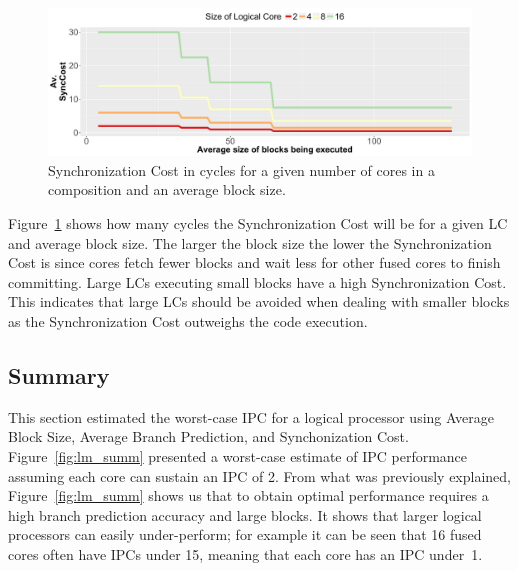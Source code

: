 \begin{figure}[h]
    \centering
    \includegraphics[width=\textwidth]{cases-paper/graphics/limit_study/sync_cost.pdf}

    \caption{Synchronization Cost in cycles for a given number of cores in a composition and an average block size.} %
    \label{fig:sync_cost}
	\vspace{1em}
\end{figure}


Figure~\ref{fig:sync_cost} shows how many cycles the Synchronization Cost will be for a given LC and average block size.
The larger the block size the lower the Synchronization Cost is since cores fetch fewer blocks and wait less for other fused cores to finish committing.
Large LCs executing small blocks have a high Synchronization Cost. 
This indicates that large LCs should be avoided when dealing with smaller blocks as the Synchronization Cost outweighs the code execution.

\subsection{Summary}

This section estimated the worst-case IPC for a logical processor using Average Block Size, Average Branch Prediction, and Synchonization Cost.
Figure~\ref{fig:lm_summ} presented a worst-case estimate of IPC performance assuming each core can sustain an IPC of 2.
From what was previously explained, Figure~\ref{fig:lm_summ} shows us that to obtain optimal performance requires a high branch prediction accuracy and large blocks.
It shows that larger logical processors can easily under-perform; for example it can be seen that 16 fused cores often have IPCs under 15, meaning that each core has an IPC under~1.

